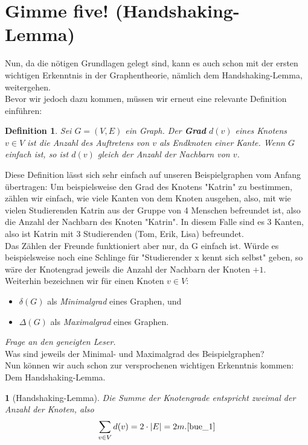 \documentclass{article}
\newtheorem{definition}{Definition}
\theoremstyle{plain}
\newcommand{\thistheoremname}{}
\newtheorem{genericthm}[theorem]{\thistheoremname}
\newenvironment{namedthm}[1]
  {\renewcommand{\thistheoremname}{#1}
   \begin{genericthm}}
  {\end{genericthm}}
\begin{document}
\section{Gimme five! (Handshaking-Lemma)}
Nun, da die nötigen Grundlagen gelegt sind, kann es auch schon mit der ersten wichtigen Erkenntnis in der Graphentheorie, nämlich dem Handshaking-Lemma, weitergehen.\\
\bigskip
Bevor wir jedoch dazu kommen, müssen wir erneut eine relevante Definition einführen:\\
\bigskip
\begin{definition} Sei \(G = (V, E)\) ein Graph. Der \textbf{Grad} \(d(v)\) eines Knotens \(v \in V\) ist die Anzahl des Auftretens von \(v\) als Endknoten einer Kante. Wenn \(G\) einfach ist, so ist \(d(v)\) gleich der Anzahl der Nachbarn von $v$.\cite[S.~5]{bue_1}
\end{definition}
\bigskip
Diese Definition lässt sich sehr einfach auf unseren Beispielgraphen vom Anfang übertragen: Um beispielsweise den Grad des Knotens "Katrin" zu bestimmen, zählen wir einfach, wie viele Kanten von dem Knoten ausgehen, also, mit wie vielen Studierenden Katrin aus der Gruppe von 4 Menschen befreundet ist, also die Anzahl der Nachbarn des Knoten "Katrin". In diesem Falle sind es \(3\) Kanten, also ist Katrin mit 3 Studierenden (Tom, Erik, Lisa) befreundet.\\
Das Zählen der Freunde funktioniert aber nur, da G einfach ist. Würde es beispielsweise noch eine Schlinge für "Studierender x kennt sich selbst" geben, so wäre der Knotengrad jeweils die Anzahl der Nachbarn der Knoten \(+1\).\\
\bigskip
Weiterhin bezeichnen wir für einen Knoten \(v \in V\):
\begin{itemize}
	\item \(\delta(G)\) als \textit{Minimalgrad} eines Graphen, und
	\item \(\Delta(G)\) als \textit{Maximalgrad} eines Graphen.\cite[S.~5]{bue_1}
\end{itemize}
\textit{Frage an den geneigten Leser.}\\
Was sind jeweils der Minimal- und Maximalgrad des Beispielgraphen?\\
\bigskip
Nun können wir auch schon zur versprochenen wichtigen Erkenntnis kommen: Dem Handshaking-Lemma.\\
\begin{namedthm}{Lemma}[Handshaking-Lemma]
Die Summe der Knotengrade entspricht zweimal der Anzahl der Knoten, also
\begin{equation*}
	\sum_{v \in V}d(v) = 2 \cdot |E| = 2m.\cite[S.~5]{bue_1}
\end{equation*}
\end{namedthm}
\end{document}
